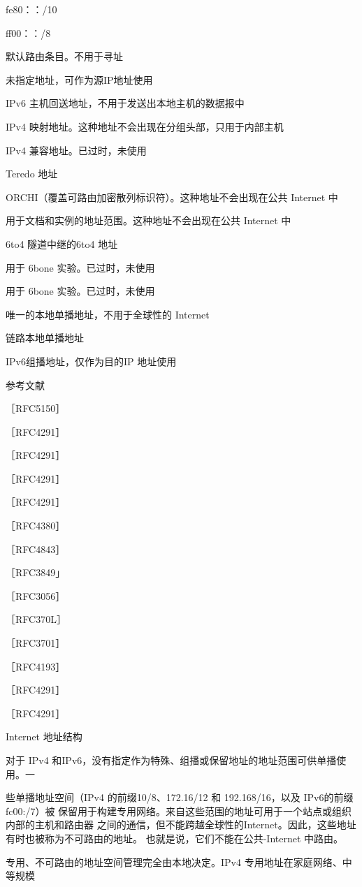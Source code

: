 fe80：：/10

ff00：：/8

默认路由条目。不用于寻址

未指定地址，可作为源IP地址使用

IPv6 主机回送地址，不用于发送出本地主机的数据报中

IPv4 映射地址。这种地址不会出现在分组头部，只用于内部主机

IPv4 兼容地址。已过时，未使用

Teredo 地址

ORCHI（覆盖可路由加密散列标识符）。这种地址不会出现在公共 Internet 中

用于文档和实例的地址范围。这种地址不会出现在公共 Internet 中

6to4 隧道中继的6to4 地址

用于 6bone 实验。已过时，未使用

用于 6bone 实验。已过时，未使用

唯一的本地单播地址，不用于全球性的 Internet

链路本地单播地址

IPv6组播地址，仅作为目的IP 地址使用

参考文献

［RFC5150］

［RFC4291］

［RFC4291］

［RFC4291］

［RFC4291］

［RFC4380］

［RFC4843］

［RFC3849」

［RFC3056］

［RFC370L］

［RFC3701］

［RFC4193］

［RFC4291］

［RFC4291］

Internet 地址结构

对于 IPv4 和IPv6，没有指定作为特殊、组播或保留地址的地址范围可供单播使用。一

些单播地址空间（IPv4 的前缀10/8、172.16/12 和 192.168/16，以及 IPv6的前缀 fc00:/7）被
保留用于构建专用网络。来自这些范围的地址可用于一个站点或组织内部的主机和路由器
之间的通信，但不能跨越全球性的Internet。因此，这些地址有时也被称为不可路由的地址。
也就是说，它们不能在公共-Internet 中路由。

专用、不可路由的地址空间管理完全由本地决定。IPv4 专用地址在家庭网络、中等规模

